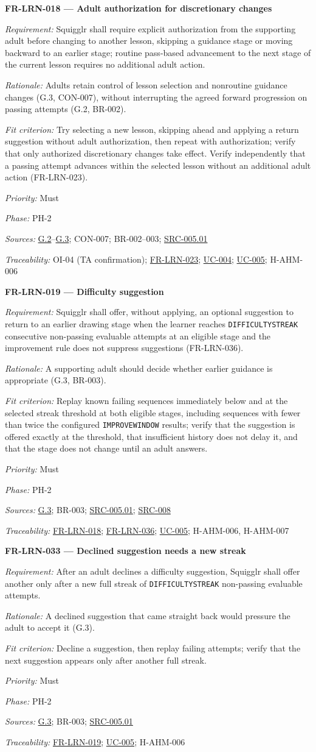 \documentclass[12pt]{article}
\renewcommand{\_}{\textunderscore\allowbreak}%
\newcommand{\goalref}[1]{\hyperref[goal:#1]{G.#1}}
\newcommand{\ucref}[1]{\hyperref[uc:#1]{\mbox{UC-#1}}}
\newenvironment{srsrequirement}[2]{%
  \par\medskip\noindent\phantomsection\label{req:#1}%
  \textbf{#1 --- #2}\par\nobreak\smallskip }{\par\medskip}
\newcommand{\reqfield}[2]{\noindent\textit{#1:} #2\par}
\newcommand{\reqshall}[1]{\reqfield{Requirement}{#1}}
\newcommand{\reqrationale}[1]{\reqfield{Rationale}{#1}}
\newcommand{\reqfit}[1]{\reqfield{Fit criterion}{#1}}
\newcommand{\reqpriority}[1]{\reqfield{Priority}{#1}}
\newcommand{\reqphase}[1]{\reqfield{Phase}{#1}}
\newcommand{\reqsources}[1]{\reqfield{Sources}{#1}}
\newcommand{\reqtraces}[1]{\reqfield{Traceability}{#1}}
\newcommand{\reqref}[1]{\hyperref[req:#1]{#1}}
\newcommand{\srcref}[1]{\hyperref[src:#1]{SRC-#1}}
\providecommand{\ucref}[1]{\hyperref[uc:#1]{UC-#1}}
\begin{document}
\begin{srsrequirement}{FR-LRN-018}{Adult authorization for discretionary changes}
  \reqshall{Squigglr shall require explicit authorization from the supporting
adult before changing to another lesson, skipping a guidance stage or moving
backward to an earlier stage; routine pass-based advancement to the next stage
of the current lesson requires no additional adult action.} \reqrationale{Adults
retain control of lesson selection and nonroutine guidance changes (G.3,
CON-007), without interrupting the agreed forward progression on passing
attempts (G.2, BR-002).} \reqfit{Try selecting a new lesson, skipping ahead and
applying a return suggestion without adult authorization, then repeat with
authorization; verify that only authorized discretionary changes take effect.
Verify independently that a passing attempt advances within the selected lesson
without an additional adult action (FR-LRN-023).}
  \reqpriority{Must}
  \reqphase{PH-2}
  \reqsources{\goalref{2}--\goalref{3}; CON-007; BR-002--003;
  \hyperref[src:005.01]{SRC-005.01}} \reqtraces{OI-04 (TA confirmation);
  \reqref{FR-LRN-023}; \ucref{004}; \ucref{005}; H-AHM-006}
\end{srsrequirement}

\begin{srsrequirement}{FR-LRN-019}{Difficulty suggestion}
  \reqshall{Squigglr shall offer, without applying, an optional suggestion to
return to an earlier drawing stage when the learner reaches
\texttt{DIFFICULTY\_\allowbreak STREAK} consecutive non-passing evaluable
attempts at an eligible stage and the improvement rule does not suppress
suggestions (FR-LRN-036).} \reqrationale{A supporting adult should decide
whether earlier guidance is appropriate (G.3, BR-003).} \reqfit{Replay known
failing sequences immediately below and at the selected streak threshold at
both eligible stages, including sequences with fewer than twice the configured
\texttt{IMPROVE\_WINDOW} results; verify that the suggestion is offered exactly
at the threshold, that insufficient history does not delay it, and that the
stage does not change until an adult answers.}
  \reqpriority{Must}
  \reqphase{PH-2}
  \reqsources{\goalref{3}; BR-003; \hyperref[src:005.01]{SRC-005.01};
  \srcref{008}} \reqtraces{\reqref{FR-LRN-018}; \reqref{FR-LRN-036};
  \ucref{005}; H-AHM-006, H-AHM-007}
\end{srsrequirement}

\begin{srsrequirement}{FR-LRN-033}{Declined suggestion needs a new streak}
  \reqshall{After an adult declines a difficulty suggestion, Squigglr shall
offer another only after a new full streak of
\texttt{DIFFICULTY\_\allowbreak STREAK} non-passing evaluable attempts.}
\reqrationale{A declined suggestion that came straight back would pressure the
adult to accept it (G.3).} \reqfit{Decline a suggestion, then replay failing
attempts; verify that the next suggestion appears only after another full
streak.}
  \reqpriority{Must}
  \reqphase{PH-2}
  \reqsources{\goalref{3}; BR-003; \hyperref[src:005.01]{SRC-005.01}}
  \reqtraces{\reqref{FR-LRN-019}; \ucref{005}; H-AHM-006}
\end{srsrequirement}
\end{document}
